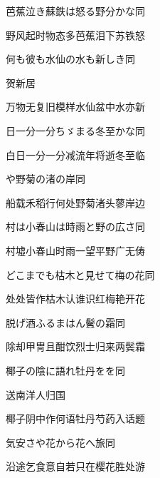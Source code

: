 \begin{haiku}
    {\FH 芭蕉泣き蘇鉄は怒る野分かな}\hfill{\FH 同}

    {\FK 野风起时物态多芭蕉泪下苏铁怒}
\end{haiku}

\begin{haiku}
    {\FH 何も彼も水仙の水も新しき}\hfill{\FH 同}

    {\FK 贺新居}

    {\FK 万物无复旧模样水仙盆中水亦新}
\end{haiku}

\begin{haiku}
    {\FH 日一分一分ちゞまる冬至かな}\hfill{\FH 同}

    {\FK 白日一分一分减流年将逝冬至临}
\end{haiku}

\begin{haiku}
    {\FH {}や野菊の渚の岸}\hfill{\FH 同}

    {\FK 船载禾稻行何处野菊渚头蓼岸边}
\end{haiku}

\begin{haiku}
    {\FH 村は小春山は時雨と野の広さ}\hfill{\FH 同}

    {\FK 村墟小春山时雨一望平野广无俦}
\end{haiku}

\begin{haiku}
    {\FH どこまでも枯木と見せて梅の花}\hfill{\FH 同}

    {\FK 处处皆作枯木认谁识红梅艳开花}
\end{haiku}

\begin{haiku}
    {\FH {}脱げ酒ふるまはん鬢の霜}\hfill{\FH 同}

    {\FK 除却甲冑且酣饮烈士归来两鬓霜}
\end{haiku}

\begin{haiku}
    {\FH 椰子の陰に語れ牡丹をを}\hfill{\FH 同}

    {\FK 送南洋人归国}

    {\FK 椰子阴中作何语牡丹芍药入话题}
\end{haiku}

\begin{haiku}
    {\FH 気安さや花から花へ旅}\hfill{\FH 同}

    {\FK 沿途乞食意自若只在樱花胜处游}
\end{haiku}


